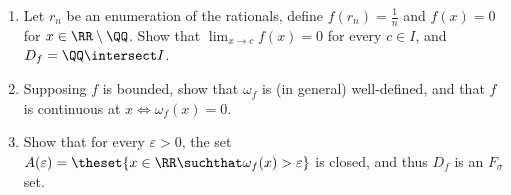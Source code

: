 \begin{problem}\hfill
\begin{enumerate}
  \item Let $r_n$ be an enumeration of the rationals, define $f(r_n) = \frac 1 n$ and $f(x) = 0$ for $x \in \RR\setminus\QQ$. Show that $\lim_{x \to c} f(x) = 0$ for every $c\in I$, and $D_f = \QQ \intersect I$.

  \item Supposing $f$ is bounded, show that $\omega_f$ is (in general) well-defined, and that $f$ is continuous at $x \iff \omega_f(x) = 0$.

  \item Show that for every $\varepsilon > 0$, the set $A(\varepsilon) = \theset{x\in\RR \suchthat \omega_f(x) > \varepsilon}$ is closed, and thus $D_f$ is an $F_\sigma$ set.
\end{enumerate}
\end{problem}


